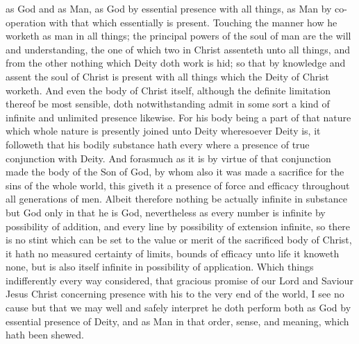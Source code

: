 as God and as Man, as God by essential presence with all things, as Man by co-operation with that which essentially is present. Touching the manner how he worketh as man in all things; the principal powers of the soul of man are the will and understanding, the one of which two in Christ assenteth unto all things, and from the other nothing which Deity doth work is hid; so that by knowledge and assent the soul of Christ is present with all things which the Deity of Christ worketh.
And even the body of Christ itself, although the definite limitation thereof be most sensible, doth notwithstanding admit in some sort a kind of infinite and unlimited presence likewise. For his body being a part of that nature which whole nature is presently joined unto Deity wheresoever Deity is, it followeth that his bodily substance hath every where a presence of true conjunction with Deity. And forasmuch as it is by virtue of that conjunction made the body of the Son of God, by whom also it was made a sacrifice for the sins of the whole world, this giveth it a presence of force and efficacy throughout all generations of men. Albeit therefore nothing be actually infinite in substance but God only in that he is God, nevertheless as every number is infinite by possibility of addition, and every line by possibility of extension infinite, so there is no stint which can be set to the value or merit of the sacrificed body of Christ, it hath no measured certainty of limits, bounds of efficacy unto life it knoweth none, but is also itself infinite in possibility of application.
Which things indifferently every way considered, that gracious promise of our Lord and Saviour Jesus Christ concerning presence with his to the very end of the world, I see no cause but that we may well and safely interpret he doth perform both as God by essential presence of Deity, and as Man in that order, sense, and meaning, which hath been shewed.

